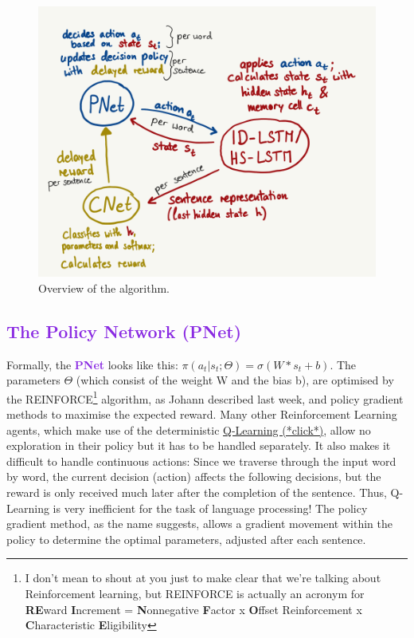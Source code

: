 \documentclass{article}
\begin{document}
\begin{figure}[h]
    \centering
    \includegraphics[scale=.4]{alg_overview.png}
    \caption{Overview of the algorithm.}
\end{figure}

\subsection{\textcolor{BlueViolet}{The Policy Network (PNet)}}\label{sec:pnet}
Formally, the \textcolor{BlueViolet}{\textbf{PNet}} looks like this: $\pi(a_t|s_t;\Theta) = \sigma(W * s_t +b)$. The parameters $\Theta $ (which consist of the weight W and the bias b), are optimised by the REINFORCE\footnote{I don't mean to shout at you just to make clear that we're talking about Reinforcement learning, but REINFORCE is actually an acronym for \textbf{RE}ward \textbf{I}ncrement = \textbf{N}onnegative \textbf{F}actor
x \textbf{O}ffset Reinforcement x \textbf{C}haracteristic \textbf{E}ligibility} algorithm, as Johann described last week, and policy gradient methods to maximise the expected reward. 
Many other Reinforcement Learning agents, which make use of the deterministic \href{https://becominghuman.ai/lets-build-an-atari-ai-part-0-intro-to-rl-9b2c5336e0ec?gi=d08d6f863052}{Q-Learning (*click*)}, allow no exploration in their policy but it has to be handled separately. It also makes it difficult to handle continuous actions: Since we traverse through the input word by word, the current decision (action) affects the following decisions, but the reward is only received much later after the completion of the sentence. Thus, Q-Learning is very inefficient for the task of language processing! The policy gradient method, as the name suggests, allows a gradient movement within the policy to determine the optimal parameters, adjusted after each sentence. \cite{sutton2000}
\end{document}
